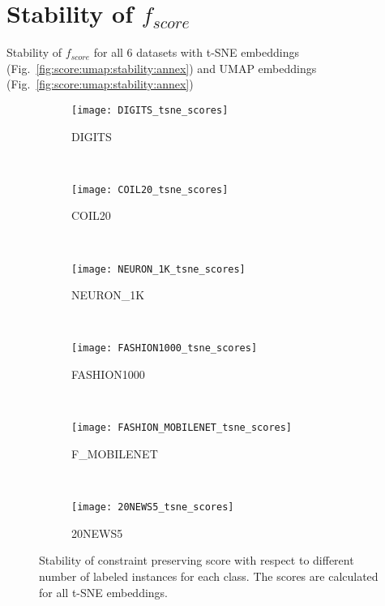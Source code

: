 \section{Stability of $f_{score}$}

Stability of $f_{score}$ for all 6 datasets with t-SNE embeddings (Fig.~\ref{fig:score:umap:stability:annex}) and UMAP embeddings (Fig.~\ref{fig:score:umap:stability:annex})

\begin{figure*}[pos=h]
    \centering
    \begin{subfigure}[b]{0.152\textwidth}
        \centering
        \texttt{[image: DIGITS\_tsne\_scores]}
        \caption{DIGITS}
    \end{subfigure}
    ~
    \begin{subfigure}[b]{0.152\textwidth}
        \texttt{[image: COIL20\_tsne\_scores]}
        \caption{COIL20}
    \end{subfigure}
    ~
    \begin{subfigure}[b]{0.152\textwidth}
        \texttt{[image: NEURON\_1K\_tsne\_scores]}
        \caption{NEURON\_1K}
    \end{subfigure}
    ~
    \begin{subfigure}[b]{0.152\textwidth}
        \centering
        \texttt{[image: FASHION1000\_tsne\_scores]}
        \caption{FASHION1000}
    \end{subfigure}
    ~
    \begin{subfigure}[b]{0.152\textwidth}
        \texttt{[image: FASHION\_MOBILENET\_tsne\_scores]}
        \caption{F\_MOBILENET}
    \end{subfigure}
    ~
    \begin{subfigure}[b]{0.152\textwidth}
        \texttt{[image: 20NEWS5\_tsne\_scores]}
        \caption{20NEWS5}
    \end{subfigure}
    \caption{Stability of constraint preserving score with respect to different number of labeled instances for each class. The scores are calculated for all t-SNE embeddings.}
    \label{fig:score:tsne:stability:annex}
\end{figure*}


